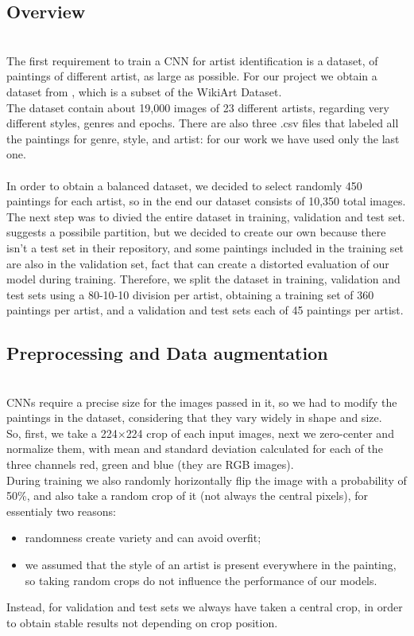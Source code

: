 \documentclass{article}
\begin{document}
\subsection{Overview}\mbox{}\\
The first requirement to train a CNN for artist identification is a dataset, of paintings of different artist, as large as possible. For our project we obtain a dataset from \cite{ArtGANDataset}, which is a subset of the WikiArt Dataset. \\
The dataset contain about 19,000 images of 23 different artists, regarding very different styles, genres  and epochs. There are also three .csv files that labeled all the paintings for genre, style, and artist: for our work we have used only the last one.\\ \\
In order to obtain a balanced dataset, we decided to select randomly 450 paintings for each artist, so in the end our dataset consists of 10,350 total images. \\
The next step was to divied the entire dataset in training, validation and test set. \cite{ArtGANDataset} suggests a possibile partition, but we decided to create our own because there isn't a test set in their repository, and some paintings included in the training set are also in the validation set, 
fact that can create a distorted evaluation of our model during training. Therefore, we split the dataset in training, validation and test sets using a 80-10-10 division per artist, obtaining a training set of 360 paintings per artist, and a validation and test sets each of 45 paintings per artist.

\subsection{Preprocessing and Data augmentation}\mbox{}\\
CNNs require a precise size for the images passed in it, so we had to modify the paintings in the dataset, considering that they vary widely in shape and size.\\
So, first, we take a 224$\times$224 crop of each input images, next we zero-center and normalize them, with mean and standard deviation calculated for each of the three channels red, green and blue (they are RGB images).  \\
During training we also randomly horizontally flip the image with a probability of 50\%, and also take a random crop of it (not always the central pixels), for essentialy two reasons:
\begin{itemize}
	\item randomness create variety and can avoid overfit;
	\item we assumed that the style of an artist is present everywhere in the painting, so taking random crops do not influence the performance of our models.
\end{itemize}
Instead, for validation and test sets we always have taken a central crop, in order to obtain stable results not depending on crop position.
\end{document}
